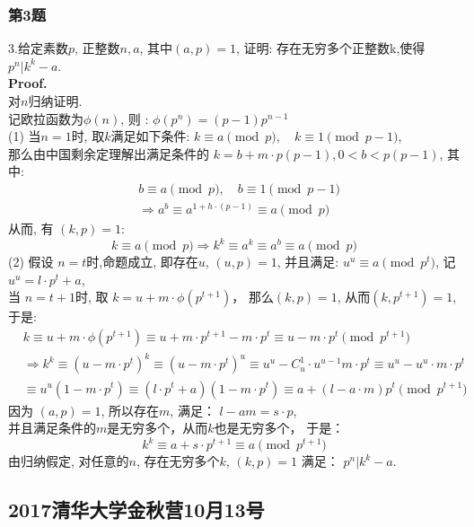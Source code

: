 \documentclass[UTF8]{article}
\begin{document}
\subsubsection{第3题}
\noindent 3.给定素数$p$, 正整数$n,a$, 其中$(a,p)=1$, 证明: 存在无穷多个正整数k,使得 $p^n|k^k-a$.\\
\textbf{Proof.}\\
对$n$归纳证明. \\
记欧拉函数为$\phi (n)$, 则 : $\phi (p^n) = (p-1)p^{n-1}$ \\
(1) 当$n=1$时, 取$k$满足如下条件: $k \equiv a \pmod p ,\quad	k \equiv 1 \pmod {p-1}$, \\
那么由中国剩余定理解出满足条件的 $k = b + m\cdot p(p-1) , 0<b < p(p-1)$, 其中: 
\begin{eqnarray*}
&	b \equiv a \pmod p ,\quad	b \equiv 1 \pmod {p-1} \\
&	\Longrightarrow a^b \equiv a^{1+h\cdot (p-1)} \equiv a \pmod p
\end{eqnarray*}
从而, 有 $(k,p)=1$:
$$k \equiv a \pmod p \Longrightarrow k^k \equiv a^k \equiv a^b \equiv a \pmod p$$ 
(2) 假设 $n=t$时,命题成立, 即存在$u$, $(u,p)=1$, 并且满足: $u^u \equiv a \pmod {p^t}$, 记 $u^u = l\cdot p^t + a$,\\
当 $n=t+1$时, 取 $k=u + m\cdot \phi (p^{t+1})$， 那么$(k,p)=1$, 从而$(k,p^{t+1}) =1$, 于是: 
\begin{eqnarray*}
	& k \equiv u+m\cdot \phi(p^{t+1}) \equiv u + m\cdot p^{t+1} - m\cdot p^t \equiv u-m\cdot p^t \pmod{p^{t+1}}\\
	&\Longrightarrow  k^k \equiv (u-m\cdot p^t)^k \equiv (u-m\cdot p^t)^u \equiv u^u -C_u^1\cdot u^{u-1} m\cdot p^t \equiv u^u - u^u\cdot m\cdot p^t \\
	& \equiv u^u(1-m\cdot p^t) \equiv (l\cdot p^t +a)(1-m\cdot p^t) \equiv a + (l-a\cdot m)p^t \pmod{p^{t+1}}
\end{eqnarray*}
因为 $(a,p)=1$, 所以存在$m$, 满足： $l-am=s\cdot p$, \\
并且满足条件的$m$是无穷多个，从而$k$也是无穷多个， 于是：
$$ k^k \equiv a + s\cdot p^{t+1} \equiv a \pmod {p^{t+1}}$$
由归纳假定, 对任意的$n$, 存在无穷多个$k$, $(k,p)=1$ 满足： $p^n|k^k-a$.

\newpage
\subsection{2017清华大学金秋营10月13号}
\end{document}
